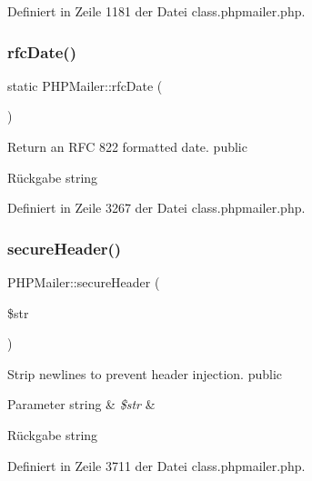 Definiert in Zeile 1181 der Datei class.\+phpmailer.\+php.

\mbox{\label{class_p_h_p_mailer_a0617b2311d5a7c5ca3308f839434c95a}} 
\subsubsection{\texorpdfstring{rfc\+Date()}{rfcDate()}}
{\footnotesize\ttfamily static P\+H\+P\+Mailer\+::rfc\+Date (\begin{DoxyParamCaption}{ }\end{DoxyParamCaption})\hspace{0.3cm}{\ttfamily [static]}}

Return an R\+FC 822 formatted date.  public \begin{DoxyReturn}{Rückgabe}
string 
\end{DoxyReturn}


Definiert in Zeile 3267 der Datei class.\+phpmailer.\+php.

\mbox{\label{class_p_h_p_mailer_aa2bef564ca933ff831f2985b7fc87298}} 
\subsubsection{\texorpdfstring{secure\+Header()}{secureHeader()}}
{\footnotesize\ttfamily P\+H\+P\+Mailer\+::secure\+Header (\begin{DoxyParamCaption}\item[{}]{\$str }\end{DoxyParamCaption})}

Strip newlines to prevent header injection.  public 
\begin{DoxyParams}[1]{Parameter}
string & {\em \$str} & \\
\hline
\end{DoxyParams}
\begin{DoxyReturn}{Rückgabe}
string 
\end{DoxyReturn}


Definiert in Zeile 3711 der Datei class.\+phpmailer.\+php.

\mbox{\label{class_p_h_p_mailer_afdd4742f07cfb0bfa7be86ce20468fa3}} 
